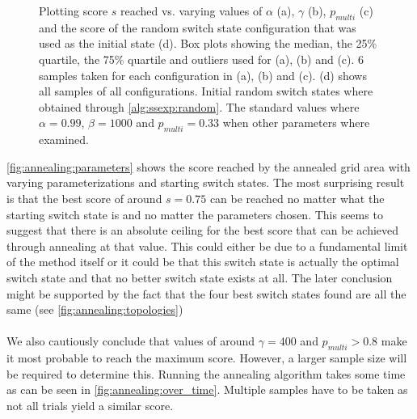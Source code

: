 \begin{figure}[H]
{        Plotting score $s$ reached vs. varying values of $\alpha$ (a), $\gamma$ (b), $p_{multi}$ (c) and
        the score of the random switch state configuration that was used as the initial state (d).
        Box plots showing the median, the 25\% quartile, the 75\% quartile and outliers used for (a), (b) and (c).
        6 samples taken for each configuration in (a), (b) and (c). (d) shows all samples of all configurations.
        Initial random switch states where obtained through \autoref{alg:ssexp:random}.
        The standard values where $\alpha = 0.99$, $\beta = 1000$ and $p_{multi} = 0.33$
        when other parameters where examined.
    }
    \label{fig:annealing:parameters}
\end{figure}

\autoref{fig:annealing:parameters} shows the score reached by the annealed grid area
with varying parameterizations and starting switch states. The most surprising result
is that the best score of around $s = 0.75$ can be reached no matter what
the starting switch state is and no matter the parameters chosen. This
seems to suggest that there is an absolute ceiling for the best score that
can be achieved through annealing at that value. This could either be due
to a fundamental limit of the method itself or it could be that this switch
state is actually the optimal switch state and that no better switch state
exists at all. The later conclusion might be supported by the fact that the
four best switch states found are all the same (see \autoref{fig:annealing:topologies})\\
\\
We also cautiously conclude that values of around $\gamma = 400$ and $p_{multi} > 0.8$
make it most probable to reach the maximum score. However, a larger sample size
will be required to determine this. Running the annealing algorithm takes some time
as can be seen in \autoref{fig:annealing:over_time}. Multiple samples have to be taken as
not all trials yield a similar score. 

